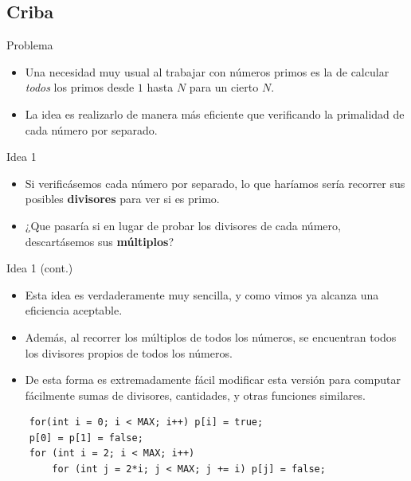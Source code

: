 \documentclass{beamer}
\begin{document}
\subsection{Criba}

\begin{frame}{Problema}
  \begin{itemize}
      \item Una necesidad muy usual al trabajar con números primos es la de calcular \textit{todos} los primos desde $1$ hasta $N$ para un cierto $N$.
      \item La idea es realizarlo de manera más eficiente que verificando la primalidad de cada número por separado.
  \end{itemize}
\end{frame}

\begin{frame}{Idea 1}
  \begin{itemize}
      \item Si verificásemos cada número por separado, lo que haríamos sería recorrer sus posibles \textbf{divisores} para ver si es primo.
      \item ¿Que pasaría si en lugar de probar los divisores de cada número, descartásemos sus \textbf{múltiplos}?
      \pause
  \end{itemize}
\end{frame}

\begin{frame}[fragile]{Idea 1 (cont.)}
  \begin{itemize}
      \item Esta idea es verdaderamente muy sencilla, y como vimos ya alcanza una eficiencia aceptable.
      \item Además, al recorrer los múltiplos de todos los números, se encuentran todos los divisores propios de todos los números.
      \item De esta forma es extremadamente fácil modificar esta versión para computar fácilmente sumas de divisores, cantidades, y otras funciones similares.
  \end{itemize}

\begin{lstlisting}
    for(int i = 0; i < MAX; i++) p[i] = true;
    p[0] = p[1] = false;
    for (int i = 2; i < MAX; i++)
        for (int j = 2*i; j < MAX; j += i) p[j] = false;
\end{lstlisting}
\end{frame}
\end{document}
